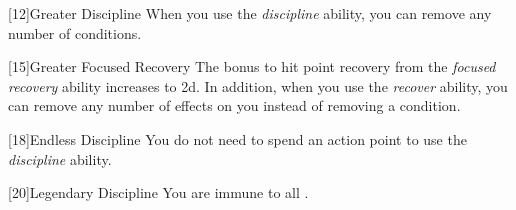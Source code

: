             [12]{Greater Discipline}
            When you use the \textit{discipline} ability, you can remove any number of conditions.

            [15]{Greater Focused Recovery}
            The bonus to hit point recovery from the \textit{focused recovery} ability increases to \plus2d.
            In addition, when you use the \textit{recover} ability, you can remove any number of  effects on you instead of removing a condition.

            [18]{Endless Discipline}
            You do not need to spend an action point to use the \textit{discipline} ability.

            [20]{Legendary Discipline} 
            You are immune to all .

